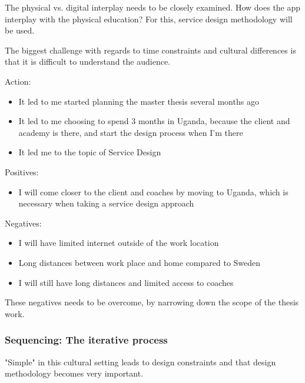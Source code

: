 The physical vs. digital interplay needs to be closely examined. How does the app interplay with the physical education? For this, service design methodology will be used.


The biggest challenge with regards to time constraints and cultural differences is that it is difficult to understand the audience.

Action:
\begin{itemize}
    \item It led to me started planning the master thesis several months ago
    \item It led to me choosing to spend 3 months in Uganda, because the client and academy is there, and start the design process when I'm there
    \item It led me to the topic of Service Design
\end{itemize}

Positives:
\begin{itemize}
    \item I will come closer to the client and coaches by moving to Uganda, which is necessary when taking a service design approach
\end{itemize}

Negatives:
\begin{itemize}
    \item I will have limited internet outside of the work location
    \item Long distances between work place and home compared to Sweden
    \item I will still have long distances and limited access to coaches\\
\end{itemize}

These negatives needs to be overcome, by narrowing down the scope of the thesis work.

\subsubsection{Sequencing: The iterative process}

"Simple" in this cultural setting leads to design constraints and that design methodology becomes very important.

